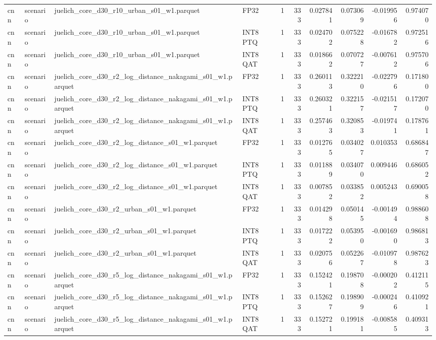 \begin{tabular}{llllrrrrrr}
cnn & scenario & juelich\_core\_d30\_r10\_urban\_s01\_w1.parquet & FP32 & 1 & 333 & 0.027841 & 0.073069 & -0.019956 & 0.974070 \\
cnn & scenario & juelich\_core\_d30\_r10\_urban\_s01\_w1.parquet & INT8 PTQ & 1 & 333 & 0.024702 & 0.075228 & -0.016782 & 0.972516 \\
cnn & scenario & juelich\_core\_d30\_r10\_urban\_s01\_w1.parquet & INT8 QAT & 1 & 333 & 0.018662 & 0.070727 & -0.007612 & 0.975706 \\
cnn & scenario & juelich\_core\_d30\_r2\_log\_distance\_nakagami\_s01\_w1.parquet & FP32 & 1 & 333 & 0.260113 & 0.322210 & -0.022796 & 0.171800 \\
cnn & scenario & juelich\_core\_d30\_r2\_log\_distance\_nakagami\_s01\_w1.parquet & INT8 PTQ & 1 & 333 & 0.260321 & 0.322157 & -0.021517 & 0.172070 \\
cnn & scenario & juelich\_core\_d30\_r2\_log\_distance\_nakagami\_s01\_w1.parquet & INT8 QAT & 1 & 333 & 0.257463 & 0.320853 & -0.019741 & 0.178761 \\
cnn & scenario & juelich\_core\_d30\_r2\_log\_distance\_s01\_w1.parquet & FP32 & 1 & 333 & 0.012765 & 0.034027 & 0.010353 & 0.686847 \\
cnn & scenario & juelich\_core\_d30\_r2\_log\_distance\_s01\_w1.parquet & INT8 PTQ & 1 & 333 & 0.011889 & 0.034070 & 0.009446 & 0.686052 \\
cnn & scenario & juelich\_core\_d30\_r2\_log\_distance\_s01\_w1.parquet & INT8 QAT & 1 & 333 & 0.007852 & 0.033852 & 0.005243 & 0.690058 \\
cnn & scenario & juelich\_core\_d30\_r2\_urban\_s01\_w1.parquet & FP32 & 1 & 333 & 0.014298 & 0.050145 & -0.001494 & 0.988608 \\
cnn & scenario & juelich\_core\_d30\_r2\_urban\_s01\_w1.parquet & INT8 PTQ & 1 & 333 & 0.017222 & 0.053950 & -0.001690 & 0.986813 \\
cnn & scenario & juelich\_core\_d30\_r2\_urban\_s01\_w1.parquet & INT8 QAT & 1 & 333 & 0.020756 & 0.052267 & -0.010978 & 0.987623 \\
cnn & scenario & juelich\_core\_d30\_r5\_log\_distance\_nakagami\_s01\_w1.parquet & FP32 & 1 & 333 & 0.152421 & 0.198708 & -0.000202 & 0.412115 \\
cnn & scenario & juelich\_core\_d30\_r5\_log\_distance\_nakagami\_s01\_w1.parquet & INT8 PTQ & 1 & 333 & 0.152627 & 0.198909 & -0.000246 & 0.410921 \\
cnn & scenario & juelich\_core\_d30\_r5\_log\_distance\_nakagami\_s01\_w1.parquet & INT8 QAT & 1 & 333 & 0.152721 & 0.199181 & -0.008585 & 0.409313 \\

\end{tabular}
